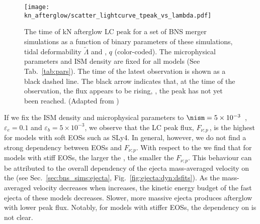 \begin{figure}[t]
    \centering 
    \texttt{[image: kn\_afterglow/scatter\_lightcurve\_tpeak\_vs\_lambda.pdf]}
    \caption{
        The time of \ac{kN} afterglow \ac{LC} peak for a set of \ac{BNS} merger simulations 
        as a function of binary parameters of these simulations, 
        tidal deformability $\tilde{\Lambda}$ and \mr{}, $q$ (color-coded). 
        The microphysical parameters and \ac{ISM} density are fixed for all models 
        (See Tab.~\ref{tab:pars}).
        The time of the latest \GRB{} observation is shown as a black dashed line.
        The black arrow indicates that, at the time of the observation, the flux appears 
        to be rising, \ie, the peak has not yet been reached.
        (Adapted from \citet{Nedora:2021eoj})
    } 
    \label{fig:lightcurve_peaks}
\end{figure}

If we fix the \ac{ISM} density and microphysical parameters to 
$\nism=5\times10^{-3}$~\gcm, $\varepsilon_e=0.1$ and $\varepsilon_b=5\times10^{-3}$, 
we observe that the \ac{LC} peak flux, $F_{\nu;p}\,$, is the highest 
for models with soft \acp{EOS} such as SLy4. 
In general, however, we do not find a strong dependency between \acp{EOS} and $F_{\nu;p}$.
With respect to the \mr{} we find that for models with stiff \acp{EOS}, 
the larger the \mr{}, the smaller the $F_{\nu;p}$. 
%
This behaviour can be attributed to the overall dependency of the ejecta mass-averaged 
velocity on the \mr{} (see Sec.~\ref{sec:bns_sims:ejecta}, Fig.~\ref{fig:ejecta:dyn:dsfits}).
As the mass-averaged velocity decreases when \mr{} increases, the 
kinetic energy budget of the fast ejecta of these models decreases. 
Slower, more massive ejecta produces afterglow  with lower peak flux.
Notably, for models with stiffer \acp{EOS}, the dependency on \mr{} is not clear. 

